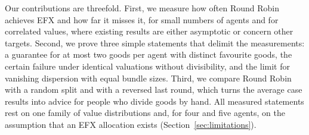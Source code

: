 Our contributions are threefold. First, we measure how often Round Robin achieves EFX and how far
it misses it, for small numbers of agents and for correlated values, where existing results are
either asymptotic or concern other targets. Second, we prove three simple statements that delimit
the measurements: a guarantee for at most two goods per agent with distinct favourite goods, the
certain failure under identical valuations without divisibility, and the limit for vanishing
dispersion with equal bundle sizes. Third, we compare Round Robin with a random split and with a
reversed last round, which turns the average case results into advice for people who divide goods
by hand. All measured statements rest on one family of value distributions and, for four and five
agents, on the assumption that an EFX allocation exists (Section~\ref{sec:limitations}).
